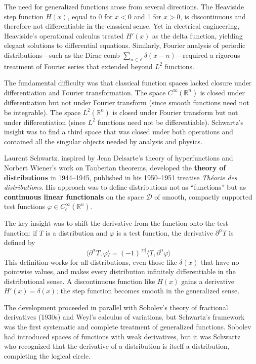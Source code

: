 The need for generalized functions arose from several directions. The Heaviside step function $H(x)$, equal to 0 for $x < 0$ and 1 for $x > 0$, is discontinuous and therefore not differentiable in the classical sense. Yet in electrical engineering, Heaviside's operational calculus treated $H'(x)$ as the delta function, yielding elegant solutions to differential equations. Similarly, Fourier analysis of periodic distributions---such as the Dirac comb $\sum_{n \in \mathbb{Z}} \delta(x - n)$---required a rigorous treatment of Fourier series that extended beyond $L^2$ functions.

The fundamental difficulty was that classical function spaces lacked closure under differentiation and Fourier transformation. The space $C^\infty(\mathbb{R}^n)$ is closed under differentiation but not under Fourier transform (since smooth functions need not be integrable). The space $L^2(\mathbb{R}^n)$ is closed under Fourier transform but not under differentiation (since $L^2$ functions need not be differentiable). Schwartz's insight was to find a third space that was closed under both operations and contained all the singular objects needed by analysis and physics.

Laurent Schwartz, inspired by Jean Delsarte's theory of hyperfunctions and Norbert Wiener's work on Tauberian theorems, developed the \textbf{theory of distributions} in 1944--1945, published in his 1950--1951 treatise \emph{Th\'eorie des distributions}. His approach was to define distributions not as ``functions'' but as \textbf{continuous linear functionals} on the space $\mathcal{D}$ of smooth, compactly supported test functions $\varphi \in C_c^\infty(\mathbb{R}^n)$.

The key insight was to shift the derivative from the function onto the test function: if $T$ is a distribution and $\varphi$ is a test function, the derivative $\partial^\alpha T$ is defined by
\[\langle \partial^\alpha T, \varphi \rangle = (-1)^{|\alpha|} \langle T, \partial^\alpha \varphi \rangle\]
This definition works for all distributions, even those like $\delta(x)$ that have no pointwise values, and makes every distribution infinitely differentiable in the distributional sense. A discontinuous function like $H(x)$ gains a derivative $H'(x) = \delta(x)$; the step function becomes smooth in the generalized sense.

The development proceeded in parallel with Sobolev's theory of fractional derivatives (1930s) and Weyl's calculus of variations, but Schwartz's framework was the first systematic and complete treatment of generalized functions. Sobolev had introduced spaces of functions with weak derivatives, but it was Schwartz who recognized that the derivative of a distribution is itself a distribution, completing the logical circle.

